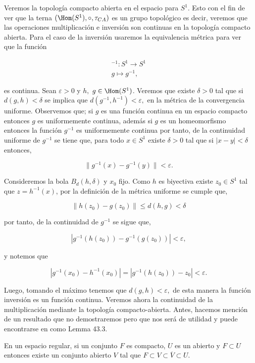  Veremos la topología compacto abierta en el espacio para $S^1$. Esto con el fin de ver que la terna $(\Hom(S^1),\circ, \tau_{CA})$ es un grupo topológico es decir, veremos que las operaciones multiplicación e inversión son continuas en la topología compacto abierta. Para el caso de la inversión usaremos la equivalencia métrica para ver que la función
 
\begin{align*}
^{-1}:S^1 \to S^1 \\
g \mapsto g^{-1},
\end{align*} 

es continua. Sean $\varepsilon >0$ y  $h,$ $g \in \Hom(S^1)$. Veremos que existe $\delta >0$ tal que si $d(g,h) < \delta$  se implica que $d(g^{-1},h^{-1}) < \varepsilon,$ en la métrica de la convergencia uniforme. Observemos que; si $g$ es una función continua en un espacio compacto entonces $g$ es uniformemente continua, además si $g$ es un homeomorfismo entonces la función $g^{-1}$ es uniformemente continua por tanto, de la continuidad uniforme de $g^{-1}$ se tiene que, para todo $x \in S^1$ existe $\delta >0$ tal que si $|x-y|< \delta$ entonces,

$$\|g^{-1}(x)-g^{-1}(y)\| < \varepsilon.$$

Consideremos la bola $B_d(h,\delta)$ y $x_0$ fijo. Como $h$ es biyectiva existe $z_0 \in S^1$ tal que $z= h^{-1}(x)$, por la definición de la métrica uniforme se cumple que,

$$\|h(z_0)-g(z_0)\| \leq d(h,g) < \delta $$

por tanto, de la continuidad de $g^{-1}$ se sigue que,

$$|g^{-1}(h(z_0))-g^{-1}(g(z_0))| < \varepsilon,$$

y notemos que 

$$ |g^{-1}(x_0)-h^{-1}(x_0)|=|g^{-1}(h(z_0))-z_0| < \varepsilon. $$

Luego, tomando el máximo tenemos que $d(g,h) < \varepsilon,$ de esta manera la función inversión es un  función continua. Veremos ahora la continuidad de la multiplicación mediante la topología compacto-abierta. Antes, hacemos mención de un resultado que no demostraremos pero que nos será de utilidad y puede encontrarse en \cite{top_willd} como Lemma 43.3.

\begin{lm}
En un espacio regular, si un conjunto $F$ es compacto, $U$ es un abierto y $F \subset U$ entonces existe un conjunto abierto $V$ tal que $F \subset V \subset \overline{V} \subset U.$
\end{lm}


